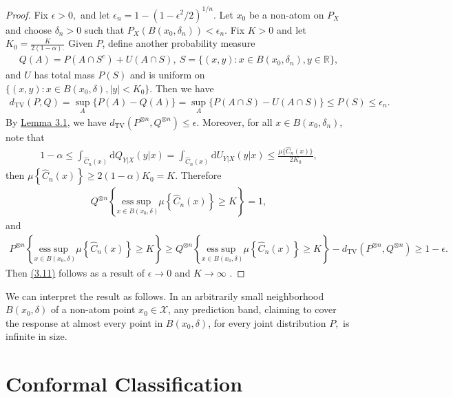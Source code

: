 \documentclass{article}
\numberwithin{equation}{section}
\begin{document}
\begin{proof}
Fix $\epsilon > 0,$ and let $\epsilon_n = 1-(1-\epsilon^2/2)^{1/n}.$ Let $x_0$ be a non-atom on $P_X$ and choose $\delta_n > 0$ such that $P_X(B(x_0,\delta_n))<\epsilon_n.$ Fix $K>0$ and let $K_0=\frac{K}{2(1-\alpha).}$ Given $P$, define another probability measure
\begin{align*}
	Q(A) = P(A\cap S^c) + U(A\cap S),\ S=\{(x,y):x\in B(x_0,\delta_n),y\in\mathbb{R}\},\tag{3.12}
\end{align*}
and $U$ has total mass $P(S)$ and is uniform on $\{(x,y):x\in B(x_0,\delta),\vert y\vert < K_0\}.$ Then we have
\begin{align*}
d_\mathrm{TV}(P,Q) = \sup_{A}\{P(A) - Q(A)\} = \sup_{A}\{P(A\cap S) - U(A\cap S)\}\leq P(S) \leq \epsilon_n.\tag{3.13}
\end{align*}
By \hyperref[Lemma 3.1]{Lemma 3.1}, we have $d_\mathrm{TV}(P^{\otimes n},Q^{\otimes n})\leq\epsilon.$ Moreover, for all $x\in B(x_0,\delta_n)$, note that
\begin{align*}
	1-\alpha \leq \int_{\widehat{C}_n(x)}\mathrm{d}Q_{Y|X}(y|x) = \int_{\widehat{C}_n(x)}\mathrm{d}U_{Y|X}(y|x) \leq \frac{ \mu\bigl\{\widehat{C}_n(x)\bigr\}}{2K_0},\tag{3.14}
\end{align*}
then $\mu\left\{\widehat{C}_n(x)\right\}\geq 2(1-\alpha)K_0=K.$ Therefore
\begin{align*}
	Q^{\otimes n}\left\{\underset{x\in B(x_0,\delta)}{\mathrm{ess}\sup}\mu\left\{\widehat{C}_n(x)\right\}\geq K\right\} = 1,\tag{3.15}
\end{align*}
and
\begin{align*}
	P^{\otimes n}\left\{\underset{x\in B(x_0,\delta)}{\mathrm{ess}\sup}\mu\left\{\widehat{C}_n(x)\right\}\geq K\right\} \geq Q^{\otimes n}\left\{\underset{x\in B(x_0,\delta)}{\mathrm{ess}\sup}\mu\left\{\widehat{C}_n(x)\right\}\geq K\right\} - d_\mathrm{TV}(P^{\otimes n},Q^{\otimes n}) \geq 1 - \epsilon.\tag{3.16}
\end{align*}
Then \hyperref[3.11]{(3.11)} follows as a result of $\epsilon\to 0$ and $K\to\infty$ .
\end{proof}

We can interpret the result as follows. In an arbitrarily small neighborhood $B(x_0,\delta)$ of a non-atom point $x_0\in\mathcal{X}$, any prediction band, claiming to cover the response at almost every point in $B(x_0,\delta)$, for every joint distribution $P,$ is infinite in size.

\section{Conformal Classification}
\end{document}
